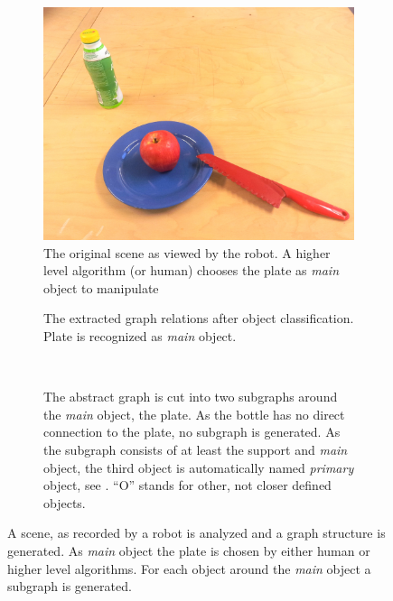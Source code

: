 \begin{figure}
  \centering
  \begin{subfigure}[]{0.475\textwidth}
    \centering
    \includegraphics[width=\textwidth]{./figures/sec/structuralinformation_example_scene.jpg}
    \caption{The original scene as viewed by the robot. A higher level algorithm (or human) chooses the plate as \emph{main} object to manipulate}
    \label{fig:sec_structuralinformation_example_scene}
  \end{subfigure}\hfill%
  \begin{subfigure}[]{0.475\textwidth}
    \centering
    
    \caption{The extracted graph relations after object classification. Plate is recognized as \emph{main} object.}
  \end{subfigure}\vspace{0.5cm}\\%
  \begin{subfigure}[]{\textwidth}
    \centering
    
    \caption{The abstract graph is cut into two subgraphs around the \emph{main} object, the plate. As the bottle has no direct connection to the plate, no subgraph is generated. As the subgraph consists of at least the support and \emph{main} object, the third object is automatically named \emph{primary} object, see . ``O'' stands for other, not closer defined objects.}
  \end{subfigure}
  \caption{A scene, as recorded by a robot is analyzed and a graph structure is generated. As \emph{main} object the plate is chosen by either human or higher level algorithms. For each object around the \emph{main} object a subgraph is generated.}
  \label{fig:sec_structuralinformation_example}
\end{figure}

